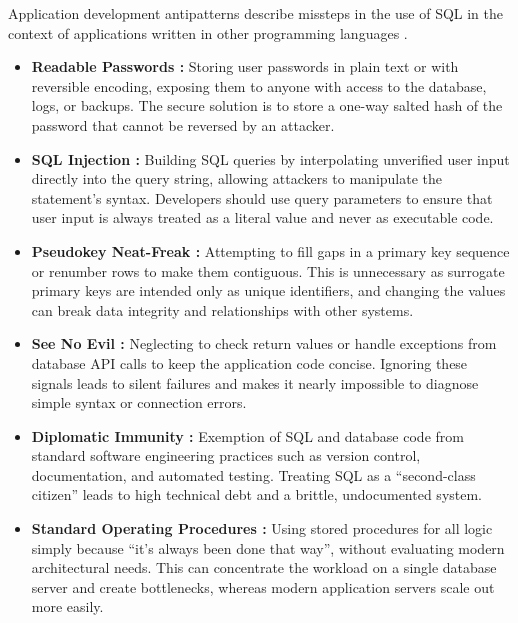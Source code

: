 Application development antipatterns describe missteps in the use of SQL in the context of applications written in other programming languages .

\begin{itemize}
    \item \textbf{Readable Passwords :} Storing user passwords in plain text or with reversible encoding, exposing them to anyone with access to the database, logs, or backups. The secure solution is to store a one-way salted hash of the password that cannot be reversed by an attacker.
    \item \textbf{SQL Injection :} Building SQL queries by interpolating unverified user input directly into the query string, allowing attackers to manipulate the statement's syntax. Developers should use query parameters to ensure that user input is always treated as a literal value and never as executable code.
    \item \textbf{Pseudokey Neat-Freak :} Attempting to fill gaps in a primary key sequence or renumber rows to make them contiguous. This is unnecessary as surrogate primary keys are intended only as unique identifiers, and changing the values can break data integrity and relationships with other systems.
    \item \textbf{See No Evil :} Neglecting to check return values or handle exceptions from database API calls to keep the application code concise. Ignoring these signals leads to silent failures and makes it nearly impossible to diagnose simple syntax or connection errors.
    \item \textbf{Diplomatic Immunity :} Exemption of SQL and database code from standard software engineering practices such as version control, documentation, and automated testing. Treating SQL as a “second-class citizen” leads to high technical debt and a brittle, undocumented system.
    \item \textbf{Standard Operating Procedures :} Using stored procedures for all logic simply because “it's always been done that way”, without evaluating modern architectural needs. This can concentrate the workload on a single database server and create bottlenecks, whereas modern application servers scale out more easily.
\end{itemize}

